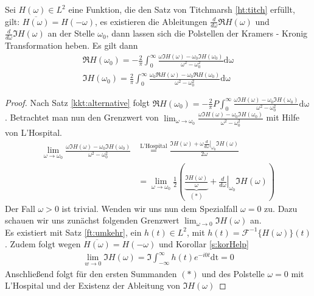 \begin{satz}\label{kkt:alternative:heb}
Sei $H(\omega) \in L^2$ eine Funktion, die den Satz von Titchmarsh \ref{ht:titch} erfüllt,  gilt: $\overline{H(\omega)} = H(-\omega)$, es existieren die Ableitungen $\frac{d}{d\omega} \Re{H(\omega)}$ und $\frac{d}{d\omega} \Im{H(\omega)}$ an der Stelle $\omega_0$, dann lassen sich die Polstellen der Kramers - Kronig Transformation heben. Es gilt dann
\begin{align}
	\Re{H(\omega_0)} = -\frac{2}{\pi} \int_0^{\infty} \frac{\omega \Im{H(\omega)}-\omega_0 \Im{H(\omega_0)}}{\omega^2 - \omega^2_0} \mathrm{d\omega}\\
	\Im{H(\omega_0)} = \frac{2}{\pi} \int_0^{\infty} \frac{\omega_0 \Re{H(\omega)} - \omega_0 \Re{H(\omega_0)}}{\omega^2 - \omega^2_0} \mathrm{d\omega}
\end{align}
\begin{proof}
Nach Satz \ref{kkt:alternative} folgt $\Re{H(\omega_0)} = -\frac{2}{\pi} P \int_0^{\infty} \frac{\omega \Im{H(\omega)}-\omega_0 \Im{H(\omega_0)}}{\omega^2 - \omega^2_0} \mathrm{d\omega}$. Betrachtet man nun den Grenzwert von $\lim_{\omega \rightarrow \omega_0} \frac{\omega \Im{H(\omega)}-\omega_0 \Im{H(\omega_0)}}{\omega^2 - \omega^2_0}$ mit Hilfe von L'Hospital. 
\begin{align}
	\lim_{\omega \rightarrow \omega_0} \frac{\omega \Im{H(\omega)}-\omega_0 \Im{H(\omega_0)}}{\omega^2 - \omega^2_0} &\stackrel{\text{L'Hospital}}{=} \frac{\Im{H(\omega)} + \omega \left. \frac{d}{d\omega} \right|_{\omega_0}  \Im{H(\omega)}}{2 \omega}\\
	& = \lim_{\omega \rightarrow \omega_0}  \frac{1}{2} \left( \underbrace{\frac{\Im{H(\omega)}}{\omega}}_{(*)} + \left. \frac{d}{d\omega}\right|_{\omega_0} \Im{H(\omega)} \right) \label{kkt:alternative:heb:1}
\end{align}
Der Fall $\omega > 0$ ist trivial. Wenden wir uns nun dem Spezialfall $\omega = 0$ zu. Dazu schauen wir uns zunächst folgenden Grenzwert  $\lim_{\omega \rightarrow 0} \Im{H(\omega)}$ an. \\
Es existiert mit Satz \ref{ft:umkehr}, ein $h(t) \in L^2$, mit $h(t) = \mathscr{F}^{-1}\{H(\omega)\}(t)$. Zudem folgt wegen $\overline{H(\omega)} = H(-\omega)$  und Korollar \ref{s:korHelp}
\begin{align}
	 \lim_{w \rightarrow 0} \Im{H(\omega)} =  \Im{\int_{-\infty}^{\infty} h(t) e^{-i 0 t} \mathrm{dt}} = 0
\end{align}
Anschließend folgt für den ersten Summanden $(*)$ und des Polstelle $\omega = 0$ mit L'Hospital und der Existenz der Ableitung von $\Im{H(\omega)}$

\end{proof}
\end{satz}
